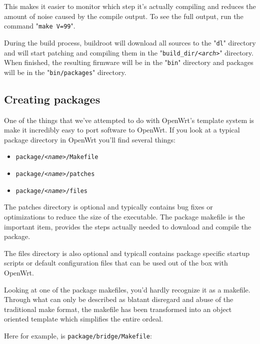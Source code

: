 This makes it easier to monitor which step it's actually compiling and reduces the amount
of noise caused by the compile output. To see the full output, run the command
"\texttt{make V=99}".

During the build process, buildroot will download all sources to the "\texttt{dl}"
directory and will start patching and compiling them in the "\texttt{build\_dir/\textit{<arch>}}"
directory. When finished, the resulting firmware will be in the "\texttt{bin}" directory
and packages will be in the "\texttt{bin/packages}" directory.


\subsection{Creating packages}

One of the things that we've attempted to do with OpenWrt's template system is make it
incredibly easy to port software to OpenWrt. If you look at a typical package directory
in OpenWrt you'll find several things:

\begin{itemize}
    \item \texttt{package/\textit{<name>}/Makefile}
    \item \texttt{package/\textit{<name>}/patches}
    \item \texttt{package/\textit{<name>}/files}
\end{itemize}

The patches directory is optional and typically contains bug fixes or optimizations to
reduce the size of the executable. The package makefile is the important item, provides
the steps actually needed to download and compile the package.

The files directory is also optional and typicall contains package specific startup scripts or default configuration files that can be used out of the box with OpenWrt.

Looking at one of the package makefiles, you'd hardly recognize it as a makefile.
Through what can only be described as blatant disregard and abuse of the traditional
make format, the makefile has been transformed into an object oriented template which
simplifies the entire ordeal.

Here for example, is \texttt{package/bridge/Makefile}:

